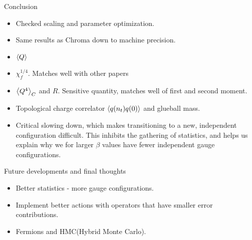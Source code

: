 \documentclass[10pt,show notes on second screen]{beamer}
\begin{document}
\begin{frame}{Conclusion}
{\begin{itemize}
    \item <1->Checked scaling and parameter optimization.
    \item <2->Same results as Chroma down to machine precision.
    \item <4->$\left\langle{Q}\right\rangle$
    \item <5->$\chi^{1/4}_f$. Matches well with other papers
    \item <6->$\left\langle{Q^4}\right\rangle_C$ and $R$. Sensitive quantity, matches well of first and second moment.
    \item <7->Topological charge correlator $\left\langle{q(n_t)q(0)}\right\rangle$ and glueball mass.
    \item <8->Critical slowing down, which makes transitioning to a new, independent configuration difficult. This inhibits the gathering of statistics, and helps us explain why we for larger $\beta$ values have fewer independent gauge configurations.
\end{itemize}
}
\end{frame}

\begin{frame}{Future developments and final thoughts}
\begin{itemize}[<+->]
    \item Better statistics - more gauge configurations.
    \item Implement better actions with operators that have smaller error contributions.
    \item Fermions and HMC(Hybrid Monte Carlo).
\end{itemize}
\end{frame}
\end{document}
